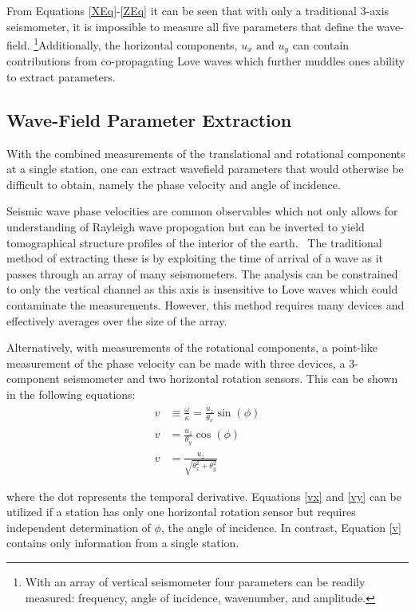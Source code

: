 \documentclass [12pt, proquest]{uwthesis}[2019]
\begin{document}
From Equations \ref{XEq}-\ref{ZEq} it can be seen that with only a traditional 3-axis seismometer, it is impossible to measure all five parameters that define the wave-field. \footnote{With an array of vertical seismometer four parameters can be readily measured: frequency, angle of incidence, wavenumber, and amplitude.}Additionally, the horizontal components, $u_x\text{ and }u_y$ can contain contributions from co-propagating Love waves which further muddles ones ability to extract parameters. 


\subsection{Wave-Field Parameter Extraction}

With the combined measurements of the translational and rotational components at a single station, one can extract wavefield parameters that would otherwise be difficult to obtain, namely the phase velocity and angle of incidence. 

Seismic wave phase velocities are common observables which not only allows for understanding of Rayleigh wave propogation but can be inverted to yield tomographical structure profiles of the interior of the earth.~\cite{tomography} The traditional method of extracting these is by exploiting the time of arrival of a wave as it passes through an array of many seismometers. The analysis can be constrained to only the vertical channel as this axis is insensitive to Love waves which could contaminate the measurements. However, this method requires many devices and effectively averages over the size of the array.

Alternatively, with measurements of the rotational components, a point-like measurement of the phase velocity can be made with three devices, a 3-component seismometer and two horizontal rotation sensors. This can be shown in the following equations:
\begin{align} 
v&\equiv\frac{\omega}{\kappa} = \frac{\dot{u_z}}{\theta_x}\sin(\phi) \label{vx} \\
v&=\frac{\dot{u_z}}{\theta_y}\cos(\phi)\label{vy} \\
v&=\frac{\dot{u_z}}{\sqrt{\theta_x^2+\theta_y^2}} \label{v}
\end{align}

where the dot represents the temporal derivative. Equations \ref{vx} and \ref{vy} can be utilized if a station has only one horizontal rotation sensor but requires independent determination of $\phi$, the angle of incidence. In contrast, Equation \ref{v} contains only information from a single station.
\end{document}
